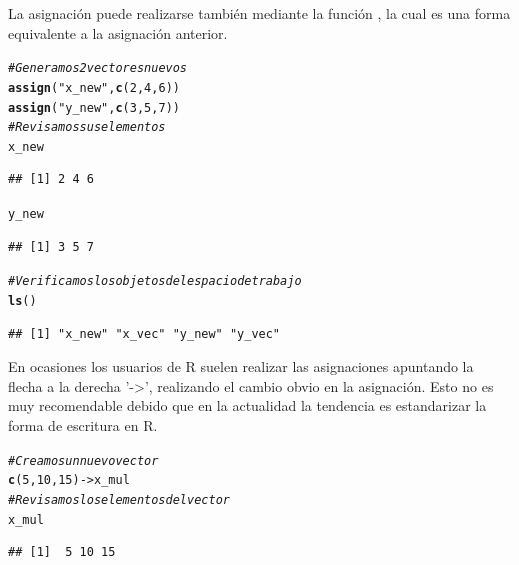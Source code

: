 \documentclass[11pt,a4paper,oneside]{book}\usepackage[]{graphicx}\usepackage[]{color}
\makeatletter
\newcommand{\hlnum}[1]{\textcolor[rgb]{0.686,0.059,0.569}{#1}}%
\newcommand{\hlstr}[1]{\textcolor[rgb]{0.192,0.494,0.8}{#1}}%
\newcommand{\hlcom}[1]{\textcolor[rgb]{0.678,0.584,0.686}{\textit{#1}}}%
\newcommand{\hlstd}[1]{\textcolor[rgb]{0.345,0.345,0.345}{#1}}%
\newcommand{\hlkwb}[1]{\textcolor[rgb]{0.69,0.353,0.396}{#1}}%
\newcommand{\hlkwd}[1]{\textcolor[rgb]{0.737,0.353,0.396}{\textbf{#1}}}%
\newenvironment{kframe}{%
 \def\at@end@of@kframe{}%
 \ifinner\ifhmode%
  \def\at@end@of@kframe{\end{minipage}}%
  \begin{minipage}{\columnwidth}%
 \fi\fi%
 \def\FrameCommand##1{\hskip\@totalleftmargin \hskip-\fboxsep
 \colorbox{shadecolor}{##1}\hskip-\fboxsep
     \hskip-\linewidth \hskip-\@totalleftmargin \hskip\columnwidth}%
 \MakeFramed {\advance\hsize-\width
   \@totalleftmargin\z@ \linewidth\hsize
   \@setminipage}}%
 {\par\unskip\endMakeFramed%
 \at@end@of@kframe}
\newenvironment{knitrout}{}{} %
\newcommand{\code}[1]{\fcolorbox{white}{gray!15}{#1}}
\makeatother
\begin{document}
\begin{itemize}
La asignación puede realizarse también mediante la función \code{\texttt{assign()}}, la cual es una forma equivalente a la asignación anterior.
\begin{knitrout}
\color{fgcolor}\begin{kframe}
\begin{alltt}
\hlcom{# Generamos 2 vectores nuevos}
\hlkwd{assign}\hlstd{(}\hlstr{"x_new"}\hlstd{,} \hlkwd{c}\hlstd{(}\hlnum{2}\hlstd{,} \hlnum{4}\hlstd{,} \hlnum{6}\hlstd{))}
\hlkwd{assign}\hlstd{(}\hlstr{"y_new"}\hlstd{,} \hlkwd{c}\hlstd{(}\hlnum{3}\hlstd{,} \hlnum{5}\hlstd{,} \hlnum{7}\hlstd{))}
\hlcom{# Revisamos sus elementos}
\hlstd{x_new}
\end{alltt}
\begin{verbatim}
## [1] 2 4 6
\end{verbatim}
\begin{alltt}
\hlstd{y_new}
\end{alltt}
\begin{verbatim}
## [1] 3 5 7
\end{verbatim}
\begin{alltt}
\hlcom{# Verificamos los objetos del espacio de trabajo}
\hlkwd{ls}\hlstd{()}
\end{alltt}
\begin{verbatim}
## [1] "x_new" "x_vec" "y_new" "y_vec"
\end{verbatim}
\end{kframe}
\end{knitrout}

En ocasiones los usuarios de R suelen realizar las asignaciones apuntando la flecha a la derecha '->', realizando el cambio obvio en la asignación. Esto no es muy recomendable debido que en la actualidad la tendencia es estandarizar la forma de escritura en R.
\begin{knitrout}
\color{fgcolor}\begin{kframe}
\begin{alltt}
\hlcom{# Creamos un nuevo vector}
\hlkwd{c}\hlstd{(}\hlnum{5}\hlstd{,}\hlnum{10}\hlstd{,}\hlnum{15}\hlstd{)} \hlkwb{->} \hlstd{x_mul}
\hlcom{# Revisamos los elementos del vector}
\hlstd{x_mul}
\end{alltt}
\begin{verbatim}
## [1]  5 10 15
\end{verbatim}
\end{kframe}
\end{knitrout}


\end{itemize}
\end{document}
